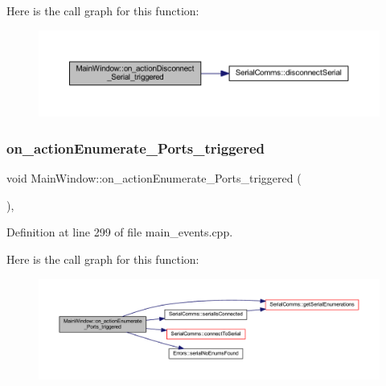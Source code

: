 Here is the call graph for this function\+:
\nopagebreak
\begin{figure}[H]
\begin{center}
\leavevmode
\includegraphics[width=350pt]{classMainWindow_adac02082b520624b82e63d66eb2f1f57_cgraph}
\end{center}
\end{figure}
\mbox{\label{classMainWindow_a46438ceaa867139cda643f2704fc7f55}} 
\subsubsection{\texorpdfstring{on\_actionEnumerate\_Ports\_triggered}{on\_actionEnumerate\_Ports\_triggered}}
{\footnotesize\ttfamily void Main\+Window\+::on\+\_\+action\+Enumerate\+\_\+\+Ports\+\_\+triggered (\begin{DoxyParamCaption}{ }\end{DoxyParamCaption})\hspace{0.3cm}{\ttfamily [private]}, {\ttfamily [slot]}}



Definition at line 299 of file main\+\_\+events.\+cpp.

Here is the call graph for this function\+:
\nopagebreak
\begin{figure}[H]
\begin{center}
\leavevmode
\includegraphics[width=350pt]{classMainWindow_a46438ceaa867139cda643f2704fc7f55_cgraph}
\end{center}
\end{figure}
\mbox{\label{classMainWindow_ad210784d93519aa0e1664b943142ad97}} 
